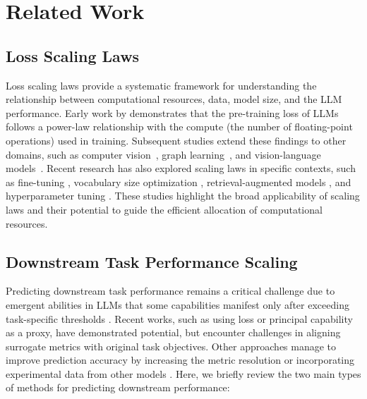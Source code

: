 
\section{Related Work}
\label{sec:relatedwork}

\subsection{Loss Scaling Laws}
Loss scaling laws provide a systematic framework for understanding the relationship between computational resources, data, model size, and the LLM performance. Early work by \citet{kaplan2020scaling} demonstrates that the pre-training loss of LLMs follows a power-law relationship with the compute (the number of floating-point operations) used in training. Subsequent studies extend these findings to other domains, such as computer vision~\citep{zhai2022scaling}, graph learning~\citep{ma2024scaling}, and vision-language models~\citep{alabdulmohsin2022scaling, henighan2020scaling}. Recent research has also explored scaling laws in specific contexts, such as fine-tuning \citep{hernandez2021scaling, tay2021scale}, vocabulary size optimization \citep{tao2024scaling}, retrieval-augmented models \citep{shao2024scaling}, and hyperparameter tuning \citep{lingle2024hyperparameters, yang2022hyperparameters}. These studies highlight the broad applicability of scaling laws and their potential to guide the efficient allocation of computational resources.

\subsection{Downstream Task Performance Scaling}

Predicting downstream task performance remains a critical challenge due to emergent abilities in LLMs that some capabilities manifest only after exceeding task-specific thresholds \citep{wei2022emergent,schaeffer2024emergent}. 
Recent works, such as using loss \citep{chen2024scaling} or principal capability \citep{ruan2024observational} as a proxy, have demonstrated potential, but encounter challenges in aligning surrogate metrics with original task objectives. Other approaches manage to improve prediction accuracy by increasing the metric resolution \citep{hu2023predicting} or incorporating experimental data from other models \citep{ye2023predictable}. 
Here, we briefly review the two main types of methods for predicting downstream performance:

